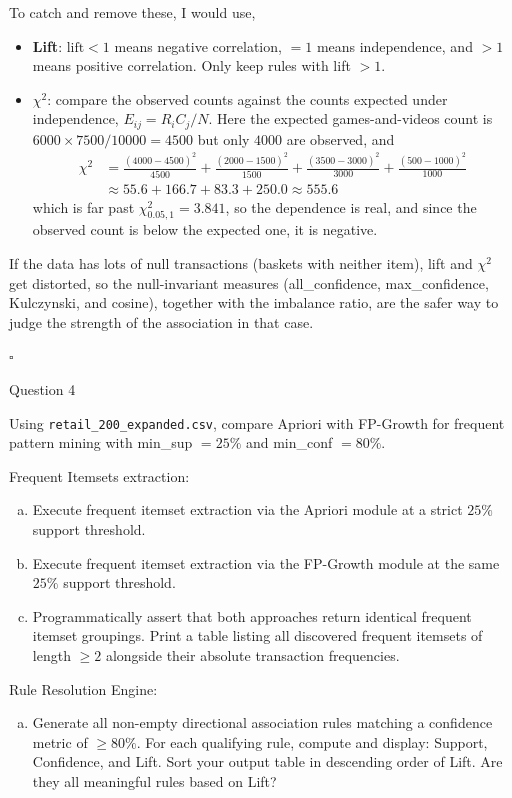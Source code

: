 \documentclass[12pt,letterpaper, onecolumn]{exam}
\begin{document}
\begin{questions}
\begin{solution}
        To catch and remove these, I would use,
        \begin{itemize}
            \item \textbf{Lift}: $\text{lift}<1$ means negative correlation, $=1$ means independence, and $>1$ means positive correlation. Only keep rules with lift $>1$.
            \item \textbf{$\chi^2$}: compare the observed counts against the counts expected under independence, $E_{ij}=R_iC_j/N$. Here the expected games-and-videos count is $6000\times7500/10000=4500$ but only $4000$ are observed, and
            \begin{align*}
                \chi^2 &= \frac{(4000-4500)^2}{4500}+\frac{(2000-1500)^2}{1500}+\frac{(3500-3000)^2}{3000}+\frac{(500-1000)^2}{1000} \\
                &\approx 55.6 + 166.7 + 83.3 + 250.0 \approx 555.6
            \end{align*}
            which is far past $\chi^2_{0.05,1}=3.841$, so the dependence is real, and since the observed count is below the expected one, it is negative.
        \end{itemize}
        If the data has lots of null transactions (baskets with neither item), lift and $\chi^2$ get distorted, so the null-invariant measures (all\_confidence, max\_confidence, Kulczynski, and cosine), together with the imbalance ratio, are the safer way to judge the strength of the association in that case.

        $\square$
    \end{solution}

    \newpage
    \question Question 4

    Using \texttt{retail\_200\_expanded.csv}, compare Apriori with FP-Growth for frequent pattern mining with min\_sup $=25\%$ and min\_conf $=80\%$.

    Frequent Itemsets extraction:
    \begin{enumerate}[a.)]
        \item Execute frequent itemset extraction via the Apriori module at a strict $25\%$ support threshold.
        \item Execute frequent itemset extraction via the FP-Growth module at the same $25\%$ support threshold.
        \item Programmatically assert that both approaches return identical frequent itemset groupings. Print a table listing all discovered frequent itemsets of length $\geq 2$ alongside their absolute transaction frequencies.
    \end{enumerate}
    Rule Resolution Engine:
    \begin{enumerate}[a.)]
        \item Generate all non-empty directional association rules matching a confidence metric of $\geq 80\%$. For each qualifying rule, compute and display: Support, Confidence, and Lift. Sort your output table in descending order of Lift. Are they all meaningful rules based on Lift?
    \end{enumerate}


\end{questions}
\end{document}
